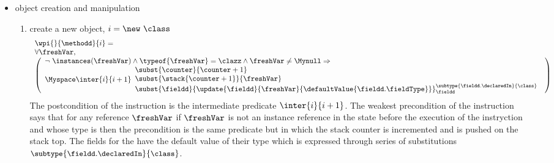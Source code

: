 \begin{itemize}

\item  object creation and manipulation 
	\begin{enumerate}
		\item create a new object, $ i = \new  \ \class $ \\
		$$ \begin{array}{l}
                         \wpi{} {\methodd}{i}  =  \\
		 
		    \forall \freshVar,\\
                    \left(\begin{array}{l}  \neg \ \instances(\freshVar) \wedge
		     \typeof{\freshVar} = \clazz \wedge
		    \freshVar \neq \Mynull  \Rightarrow \\
		      
			                 \Myspace   %
					
                                    \inter{i}{i+1} \begin{array}{l}
		                                   \subst{ \counter}{ \counter + 1 } \\
						   \subst{ \stack{ \counter + 1} }{\freshVar} \\
						   \subst{ \fieldd} { \update{\fieldd} { \freshVar }{\defaultValue{ \fieldd.  \fieldType } } }_{{\small \fieldd}}^{{\small \subtype{\fieldd.\declaredIn}{  \class}} } \\
		       \end{array} 
                  \end{array} \right)
              \end{array}$$
		  The postcondition of the instruction \new{} is the intermediate predicate $\inter{i}{i+1}$. The weakest precondition 
		  of the instruction says that for any reference $\freshVar$ 
		  if $\freshVar$ is not an instance reference  in the state before the execution of the instryction and whose type is \class{}  then
		  the precondition is the same predicate but in which the stack
		  counter is incremented and \freshVar{}  is pushed on the stack top. The fields for the 
		  \freshVar{} have the default value of their type which is expressed through series of substitutions ${\small \subtype{\fieldd.\declaredIn}{  \class}}  $. 
	

\end{enumerate}
\end{itemize}
